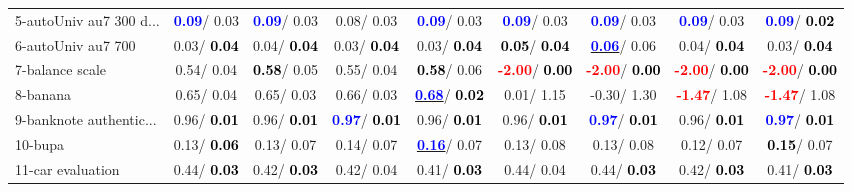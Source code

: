 \begin{table}[h]
\begin{center}
\begin{tabular}{lc|c|c|c|c|c|c|c}
5-autoUniv au7 300 d... & \textcolor{blue}{\textbf{  0.09}}/  0.03 & \textcolor{blue}{\textbf{  0.09}}/  0.03 &   0.08/  0.03 & \textcolor{blue}{\textbf{  0.09}}/  0.03 & \textcolor{blue}{\textbf{  0.09}}/  0.03 & \textcolor{blue}{\textbf{  0.09}}/  0.03 & \textcolor{blue}{\textbf{  0.09}}/  0.03 & \textcolor{blue}{\textbf{  0.09}}/\textcolor{black}{\textbf{  0.02}} \\
6-autoUniv au7 700 &   0.03/\textcolor{black}{\textbf{  0.04}} &   0.04/\textcolor{black}{\textbf{  0.04}} &   0.03/\textcolor{black}{\textbf{  0.04}} &   0.03/\textcolor{black}{\textbf{  0.04}} & \textcolor{black}{\textbf{  0.05}}/\textcolor{black}{\textbf{  0.04}} & \underline{\textcolor{blue}{\textbf{  0.06}}}/  0.06 &   0.04/\textcolor{black}{\textbf{  0.04}} &   0.03/\textcolor{black}{\textbf{  0.04}} \\
7-balance scale &   0.54/  0.04 & \textcolor{black}{\textbf{  0.58}}/  0.05 &   0.55/  0.04 & \textcolor{black}{\textbf{  0.58}}/  0.06 & \textcolor{red}{\textbf{ -2.00}}/\textcolor{black}{\textbf{  0.00}} & \textcolor{red}{\textbf{ -2.00}}/\textcolor{black}{\textbf{  0.00}} & \textcolor{red}{\textbf{ -2.00}}/\textcolor{black}{\textbf{  0.00}} & \textcolor{red}{\textbf{ -2.00}}/\textcolor{black}{\textbf{  0.00}} \\ \hline
8-banana &   0.65/  0.04 &   0.65/  0.03 &   0.66/  0.03 & \underline{\textcolor{blue}{\textbf{  0.68}}}/\textcolor{black}{\textbf{  0.02}} &   0.01/  1.15 &  -0.30/  1.30 & \textcolor{red}{\textbf{ -1.47}}/  1.08 & \textcolor{red}{\textbf{ -1.47}}/  1.08 \\
9-banknote authentic... &   0.96/\textcolor{black}{\textbf{  0.01}} &   0.96/\textcolor{black}{\textbf{  0.01}} & \textcolor{blue}{\textbf{  0.97}}/\textcolor{black}{\textbf{  0.01}} &   0.96/\textcolor{black}{\textbf{  0.01}} &   0.96/\textcolor{black}{\textbf{  0.01}} & \textcolor{blue}{\textbf{  0.97}}/\textcolor{black}{\textbf{  0.01}} &   0.96/\textcolor{black}{\textbf{  0.01}} & \textcolor{blue}{\textbf{  0.97}}/\textcolor{black}{\textbf{  0.01}} \\
10-bupa &   0.13/\textcolor{black}{\textbf{  0.06}} &   0.13/  0.07 &   0.14/  0.07 & \underline{\textcolor{blue}{\textbf{  0.16}}}/  0.07 &   0.13/  0.08 &   0.13/  0.08 &   0.12/  0.07 & \textcolor{black}{\textbf{  0.15}}/  0.07 \\
11-car evaluation &   0.44/\textcolor{black}{\textbf{  0.03}} &   0.42/\textcolor{black}{\textbf{  0.03}} &   0.42/  0.04 &   0.41/\textcolor{black}{\textbf{  0.03}} &   0.44/  0.04 &   0.44/\textcolor{black}{\textbf{  0.03}} &   0.42/\textcolor{black}{\textbf{  0.03}} &   0.41/\textcolor{black}{\textbf{  0.03}} \\

\end{tabular}
\end{center}
\end{table}
